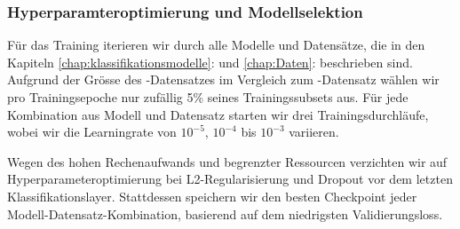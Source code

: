 \subsubsection{Hyperparamteroptimierung und Modellselektion}
Für das Training iterieren wir durch alle Modelle und Datensätze, die in den Kapiteln \ref{chap:klassifikationsmodelle}:  und \ref{chap:Daten}:  beschrieben sind. Aufgrund der Grösse des -Datensatzes im Vergleich zum -Datensatz wählen wir pro Trainingsepoche nur zufällig 5\% seines Trainingssubsets aus. Für jede Kombination aus Modell und Datensatz starten wir drei Trainingsdurchläufe, wobei wir die Learningrate von $10^{-5}$, $10^{-4}$ bis $10^{-3}$ variieren. 

Wegen des hohen Rechenaufwands und begrenzter Ressourcen verzichten wir auf Hyperparameteroptimierung bei L2-Regularisierung und Dropout vor dem letzten Klassifikationslayer. Stattdessen speichern wir den besten Checkpoint jeder Modell-Datensatz-Kombination, basierend auf dem niedrigsten Validierungsloss.
